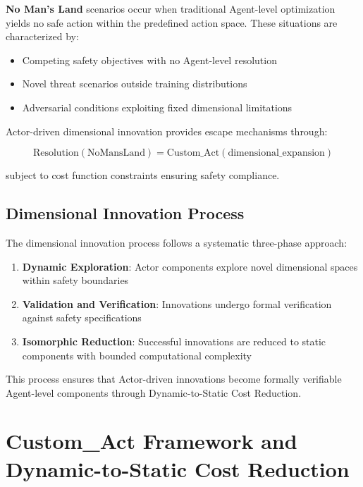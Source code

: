 \documentclass[12pt,a4paper]{article}
\begin{document}
\textbf{No Man's Land} scenarios occur when traditional Agent-level optimization yields no safe action within the predefined action space. These situations are characterized by:

\begin{itemize}
    \item Competing safety objectives with no Agent-level resolution
    \item Novel threat scenarios outside training distributions
    \item Adversarial conditions exploiting fixed dimensional limitations
\end{itemize}

Actor-driven dimensional innovation provides escape mechanisms through:

\begin{equation}
\text{Resolution}(\text{NoMansLand}) = \text{Custom\_Act}(\text{dimensional\_expansion})
\end{equation}

subject to cost function constraints ensuring safety compliance.

\subsection{Dimensional Innovation Process}

The dimensional innovation process follows a systematic three-phase approach:

\begin{enumerate}
    \item \textbf{Dynamic Exploration}: Actor components explore novel dimensional spaces within safety boundaries
    \item \textbf{Validation and Verification}: Innovations undergo formal verification against safety specifications
    \item \textbf{Isomorphic Reduction}: Successful innovations are reduced to static components with bounded computational complexity
\end{enumerate}

This process ensures that Actor-driven innovations become formally verifiable Agent-level components through Dynamic-to-Static Cost Reduction.

\clearpage

\section{Custom\_Act Framework and Dynamic-to-Static Cost Reduction}
\end{document}
